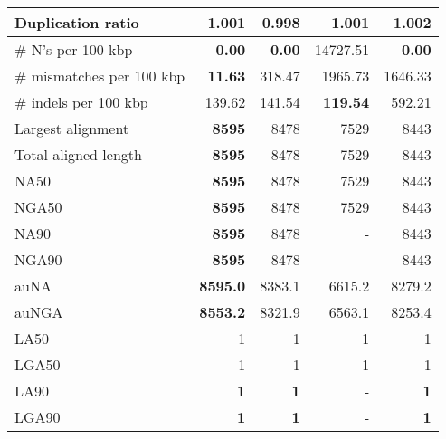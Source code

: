 \documentclass[12pt,a4paper]{article}
\begin{document}
\begin{table}[ht]
\begin{center}
\begin{tabular}{|l*{4}{|r}|}
Duplication ratio & 1.001 & {\bf 0.998} & 1.001 & 1.002 \\ \hline
\# N's per 100 kbp & {\bf 0.00} & {\bf 0.00} & 14727.51 & {\bf 0.00} \\ \hline
\# mismatches per 100 kbp & {\bf 11.63} & 318.47 & 1965.73 & 1646.33 \\ \hline
\# indels per 100 kbp & 139.62 & 141.54 & {\bf 119.54} & 592.21 \\ \hline
Largest alignment & {\bf 8595} & 8478 & 7529 & 8443 \\ \hline
Total aligned length & {\bf 8595} & 8478 & 7529 & 8443 \\ \hline
NA50 & {\bf 8595} & 8478 & 7529 & 8443 \\ \hline
NGA50 & {\bf 8595} & 8478 & 7529 & 8443 \\ \hline
NA90 & {\bf 8595} & 8478 & - & 8443 \\ \hline
NGA90 & {\bf 8595} & 8478 & - & 8443 \\ \hline
auNA & {\bf 8595.0} & 8383.1 & 6615.2 & 8279.2 \\ \hline
auNGA & {\bf 8553.2} & 8321.9 & 6563.1 & 8253.4 \\ \hline
LA50 & 1 & 1 & 1 & 1 \\ \hline
LGA50 & 1 & 1 & 1 & 1 \\ \hline
LA90 & {\bf 1} & {\bf 1} & - & {\bf 1} \\ \hline
LGA90 & {\bf 1} & {\bf 1} & - & {\bf 1} \\ \hline
\end{tabular}
\end{center}
\end{table}
\end{document}
